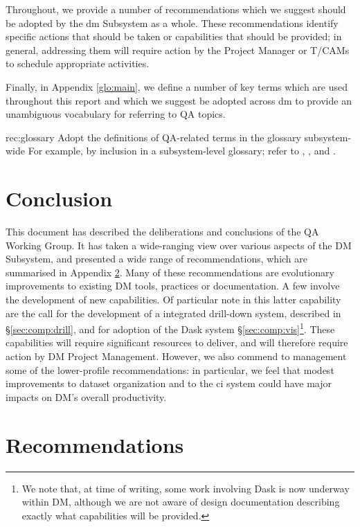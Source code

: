 \documentclass[DM,authoryear,toc,lsstdraft]{lsstdoc}
\makeatletter
\newcommand{\printrecs}{%
  \section{Recommendations}%
  \label{sec:recs}
  \begin{enumerate}[leftmargin=7em,label=QAWG-REC-\arabic*:]%
  \def\@noitemerr{\@latex@warning{Empty objective list}}%
  \@starttoc{rec}%
  \end{enumerate}%
}
\makeatother
\begin{document}
Throughout, we provide a number of recommendations which we suggest should be
adopted by the \gls{dm} Subsystem as a whole. These recommendations identify
specific actions that should be taken or capabilities that should be provided;
in general, addressing them will require action by the Project Manager or
T/CAMs to schedule appropriate activities.

Finally, in Appendix \ref{glo:main}, we define a number of key terms which are
used throughout this report and which we suggest be adopted across \gls{dm} to
provide an unambiguous vocabulary for referring to QA topics.

\begin{recommendation}
    {rec:glossary}
    {Adopt the definitions of QA-related terms in the  glossary subsystem-wide}
For example, by inclusion in a subsystem-level glossary; refer to
, , and .
\end{recommendation}





\section{Conclusion}

This document has described the deliberations and conclusions of the QA Working Group.
It has taken a wide-ranging view over various aspects of the DM Subsystem, and presented a wide range of recommendations, which are summarised in Appendix \ref{sec:recs}.
Many of these recommendations are evolutionary improvements to existing DM tools, practices or documentation.
A few involve the development of new capabilities.
Of particular note in this latter capability are the call for the development of a integrated drill-down system, described in \S\ref{sec:comp:drill}, and for adoption of the Dask system \S\ref{sec:comp:vis}\footnote{We note that, at time of writing, some work involving Dask is now underway within DM, although we are not aware of design documentation describing exactly what capabilities will be provided.}.
These capabilities will require significant resources to deliver, and will therefore require action by DM Project Management.
However, we also commend to management some of the lower-profile recommendations: in particular, we feel that modest improvements to dataset organization and to the \gls{ci} system could have major impacts on DM's overall productivity.

\appendix
\printrecs
\glsaddall
\renewcommand*{\glsautoprefix}{glo:}
\printglossary[style=index,numberedsection=autolabel]


\end{document}
